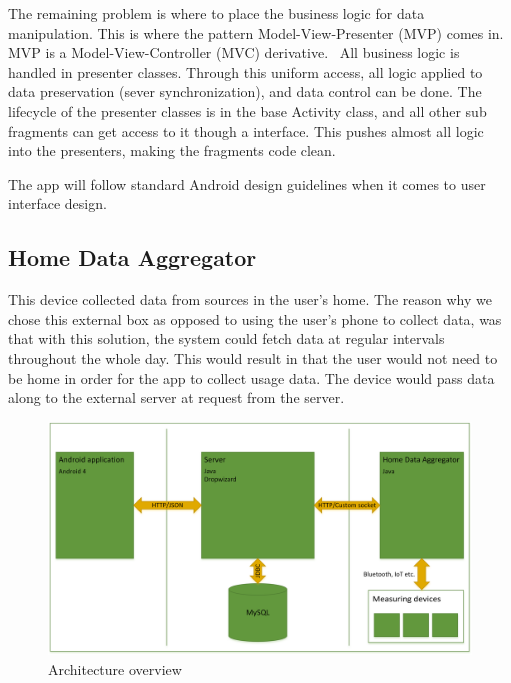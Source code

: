 The remaining problem is where to place the business logic for data manipulation. This is where the pattern Model-View-Presenter (MVP) comes in. MVP is a Model-View-Controller (MVC) derivative.~\cite{mvc} All business logic is handled in presenter classes. Through this uniform access, all logic applied to data preservation (sever synchronization), and data control can be done. The lifecycle of the presenter classes is in the base Activity class, and all other sub fragments can get access to it though a interface. This pushes almost all logic into the presenters, making the fragments code clean.

The app will follow standard Android design guidelines when it comes to user interface design.

\subsection{Home Data Aggregator}
This device collected data from sources in the user's home. The reason why we chose this external box as opposed to using the user's phone to collect data, was that with this solution, the system could fetch data at regular intervals throughout the whole day. This would result in that the user would not need to be home in order for the app to collect 
usage data. The device would pass data along to the external server at request from the server.

\begin{figure}[H]
\includegraphics[width=\textwidth]{ch/architecture/fig/architecture.png}
\caption{Architecture overview}
\end{figure}
